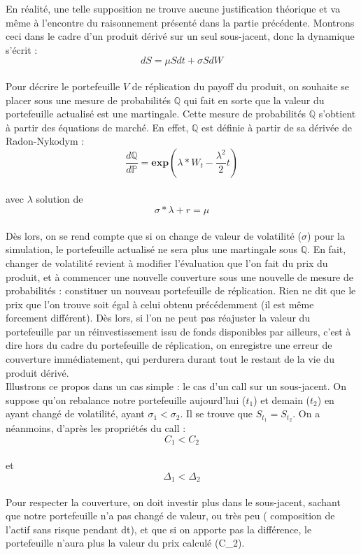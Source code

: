 \documentclass[french,12pt,a4paper]{article}
\begin{document}
En réalité, une telle supposition ne trouve aucune justification théorique et va même à l'encontre du raisonnement présenté dans la partie précédente. Montrons ceci dans le cadre d'un produit dérivé sur un seul sous-jacent, donc la dynamique s’écrit : 
\\$$ dS = \mu Sdt + \sigma SdW $$  \\
Pour décrire le portefeuille $V$ de réplication du payoff du produit, on souhaite se placer sous une mesure de probabilités $\mathbb{Q}$ qui fait en sorte que la valeur du portefeuille actualisé est une martingale. Cette mesure de probabilités $\mathbb{Q}$ s'obtient à partir des équations de marché. En effet, $\mathbb{Q}$ est définie à partir de sa dérivée de Radon-Nykodym :\\
$$\frac{d\mathbb{Q}}{d\mathbb{P}}= \textbf{exp}(\lambda * W_{t} - \frac{\lambda^{2}}{2}t) $$ \\

avec $\lambda$ solution de $$ \sigma * \lambda + r = \mu $$ \\

Dès lors, on se rend compte que si on change de valeur de volatilité ($\sigma$) pour la simulation, le portefeuille actualisé ne sera plus une martingale sous $\mathbb{Q}$. En fait, changer de volatilité revient à modifier l'évaluation que l'on fait du prix du produit, et à commencer une nouvelle couverture sous une nouvelle de mesure de probabilités : constituer un nouveau portefeuille de réplication. Rien ne dit que le prix que l'on trouve soit égal à celui obtenu précédemment (il est même forcement différent). Dès lors, si l'on ne peut pas réajuster la valeur du portefeuille par un réinvestissement issu de fonds disponibles par ailleurs, c'est à dire hors du cadre du portefeuille de réplication, on enregistre une erreur de couverture immédiatement, qui perdurera durant tout le restant de la vie du produit dérivé.\\

Illustrons ce propos dans un cas simple : le cas d'un call sur un sous-jacent. On suppose qu'on rebalance notre portefeuille aujourd'hui ($t_{1}$) et demain ($t_{2}$) en ayant changé de volatilité, ayant $\sigma_{1}<\sigma_{2}$. Il se trouve que $S_{t_{1}}=S_{t_{2}}$. On a néanmoins, d'après les propriétés du call : \\
$$C_{1}<C_{2}$$\\ et $$\Delta_{1}<\Delta_{2}$$ \\
Pour respecter la couverture, on doit investir plus dans le sous-jacent, sachant que notre portefeuille n'a pas changé de valeur, ou très peu ( composition de l'actif sans risque pendant dt), et que si on apporte pas la différence, le portefeuille n'aura plus la valeur du prix calculé (C_{2}).\\
\end{document}
